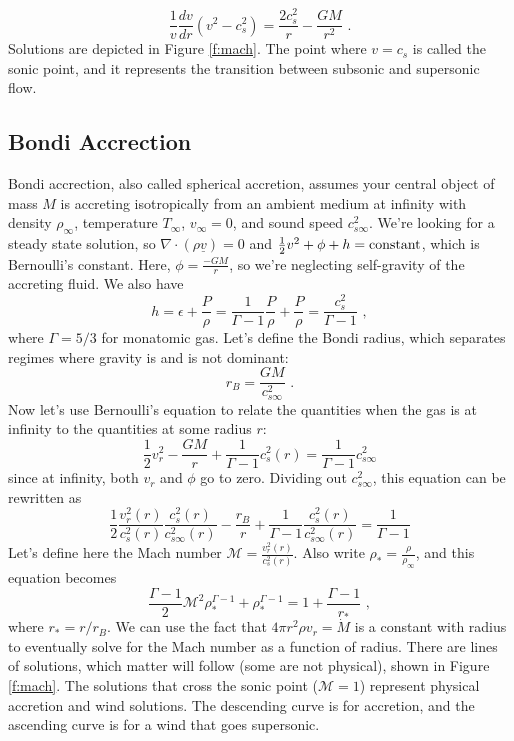 \begin{equation}
\frac{1}{v} \frac{dv}{dr} (v^2 - c_s^2) = \frac{2 c_s^2}{r} - \frac{G M}{r^2}\,\,.
\end{equation}
Solutions are depicted in Figure \ref{f:mach}. The point where $v = c_s$ is called the sonic point, and it represents the transition between subsonic and supersonic flow.

\subsection{Bondi Accrection}

Bondi accrection, also called spherical accretion, assumes your central object of mass $M$ is accreting isotropically from an ambient medium at infinity with density $\rho_\infty$, temperature $T_\infty$, $v_\infty = 0$, and sound speed $c_{s\infty}^2$. We're looking for a steady state solution, so $\nabla \cdot (\rho \underline{v}) = 0$ and $\frac{1}{2} v^2 + \phi + h = {\rm constant}$, which is Bernoulli's constant. Here, $\phi = \frac{-G M}{r}$, so we're neglecting self-gravity of the accreting fluid. We also have
\begin{equation}
h = \epsilon + \frac{P}{\rho} = \frac{1}{\Gamma - 1}\frac{P}{\rho} + \frac{P}{\rho} = \frac{c_s^2}{\Gamma - 1}\,\, ,
\end{equation}
where $\Gamma = 5/3$ for monatomic gas. Let's define the Bondi radius, which separates regimes where gravity is and is not dominant:
\begin{equation}
r_B = \frac{G M}{c_{s \infty}^2} \,\,.
\end{equation}
Now let's use Bernoulli's equation to relate the quantities when the gas is at infinity to the quantities at some radius $r$:
\begin{equation}
\frac{1}{2} v_r^2 - \frac{G M}{r} + \frac{1}{\Gamma - 1} c_s^2(r) = \frac{1}{\Gamma - 1} c_{s \infty}^2
\end{equation}
since at infinity, both $v_r$ and $\phi$ go to zero. Dividing out $c_{s \infty}^2$, this equation can be rewritten as 
\begin{equation}
\frac{1}{2}\frac{v_r^2(r)}{c_s^2(r)}\frac{c_s^2(r)}{c_{s \infty}^2(r)} - \frac{r_B}{r} + \frac{1}{\Gamma - 1}\frac{c_s^2(r)}{c_{s \infty}^2(r)} = \frac{1}{\Gamma - 1}
\end{equation}
Let's define here the Mach number $\mathcal{M} = \frac{v_r^2(r)}{c_s^2(r)}$. Also write $\rho_* = \frac{\rho}{\rho_\infty}$, and this equation becomes
\begin{equation}
\frac{\Gamma - 1}{2}\mathcal{M}^2 \rho_*^{\Gamma - 1} + \rho_*^{\Gamma - 1} = 1 + \frac{\Gamma - 1}{r_*}\,\, ,
\end{equation}
where $r_* = r/r_B$. We can use the fact that $4 \pi r^2 \rho v_r = \dot{M}$ is a constant with radius to eventually solve for the Mach number as a function of radius. There are lines of solutions, which matter will follow (some are not physical), shown in Figure \ref{f:mach}. The solutions that cross the sonic point ($\mathcal{M} = 1$) represent physical accretion and wind solutions. The descending curve is for accretion, and the ascending curve is for a wind that goes supersonic.

